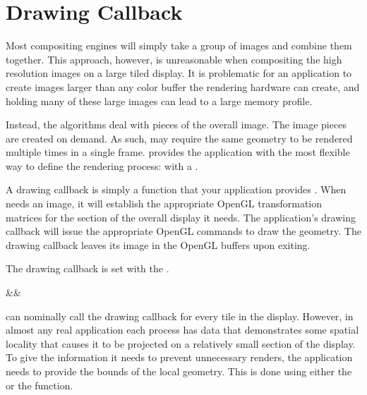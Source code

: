 
\section{Drawing Callback}
\label{sec:Basic_Usage::Drawing_Callback}


Most compositing engines will simply take a group of images and combine them
together.  This approach, however, is unreasonable when compositing the
high resolution images on a large tiled display.  It is problematic for an
application to create images larger than any color buffer the rendering
hardware can create, and holding many of these large images can lead to a
large memory profile.

Instead, the \IceT algorithms deal with pieces of the overall image.  The
image pieces are created on demand.  As such, \IceT may require the same
geometry to be rendered multiple times in a single frame.  \IceT provides
the application with the most flexible way to define the rendering process:
with a .

A drawing callback is simply a function that your application provides
\IceT.  When \IceT needs an image, it will establish the appropriate OpenGL
transformation matrices for the section of the overall display it needs.
The application's drawing callback will issue the appropriate OpenGL
commands to draw the geometry.  The drawing callback leaves its image in
the OpenGL buffers upon exiting.

The drawing callback is set with the .


\begin{Table}{3}
  \textC{(}&&\quad\textC{);}
\end{Table}

\IceT can nominally call the drawing callback for every tile in the
display.  However, in almost any real application each process has data
that demonstrates some spatial locality that causes it to be projected on a
relatively small section of the display.  To give \IceT the information it
needs to prevent unnecessary renders, the application needs to provide the
bounds of the local geometry.  This is done using either the
 or the  function.


